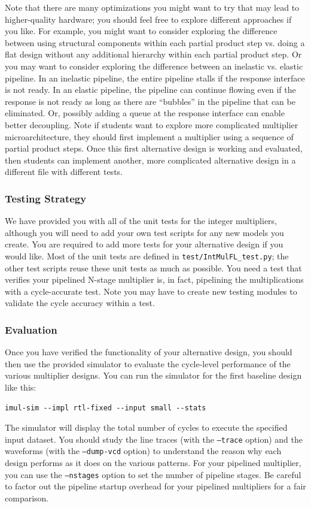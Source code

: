 \documentclass[a4paper,12pt,twoside]{article}
\begin{document}
Note that there are many optimizations you might want to try that may lead to higher-quality hardware; you should feel free to explore different approaches if you like. For example, you might want to consider exploring the difference between using structural components within each partial product step vs. doing a flat design without any additional hierarchy within each partial product step. Or you may want to consider exploring the difference between an inelastic vs. elastic pipeline. In an inelastic pipeline, the entire pipeline stalls if the response interface is not ready. In an elastic pipeline, the pipeline can continue flowing even if the response is not ready as long as there are “bubbles” in the pipeline that can be eliminated. Or, possibly adding a queue at the response interface can enable better decoupling. Note if students want to explore more complicated multiplier microarchitecture, they should first implement a multiplier using a sequence of partial product steps. Once this first alternative design is working and evaluated, then students can implement another, more complicated alternative design in a different file with different tests.
\subsubsection{Testing Strategy}
We have provided you with all of the unit tests for the integer multipliers, although you will need to add your own test scripts for any new models you create. You are required to add more tests for your alternative design if you would like. Most of the unit tests are defined in \texttt{test/IntMulFL\_test.py}; the other test scripts reuse these unit tests as much as possible. You need a test that verifies your pipelined N-stage multiplier is, in fact, pipelining the multiplications with a cycle-accurate test. Note you may have to create new testing modules to validate the cycle accuracy within a test.
\subsubsection{Evaluation}
Once you have verified the functionality of your alternative design, you should then use the provided simulator to evaluate the cycle-level performance of the various multiplier designs. You can run the simulator for the first baseline design like this:
\begin{verbatim}
imul-sim --impl rtl-fixed --input small --stats
\end{verbatim}
The simulator will display the total number of cycles to execute the specified input dataset. You should study the line traces (with the \texttt{--trace} option) and the waveforms (with the \texttt{--dump-vcd} option) to understand the reason why each design performs as it does on the various patterns. For your pipelined multiplier, you can use the \texttt{--nstages} option to set the number of pipeline stages. Be careful to factor out the pipeline startup overhead for your pipelined multipliers for a fair comparison.
\end{document}

